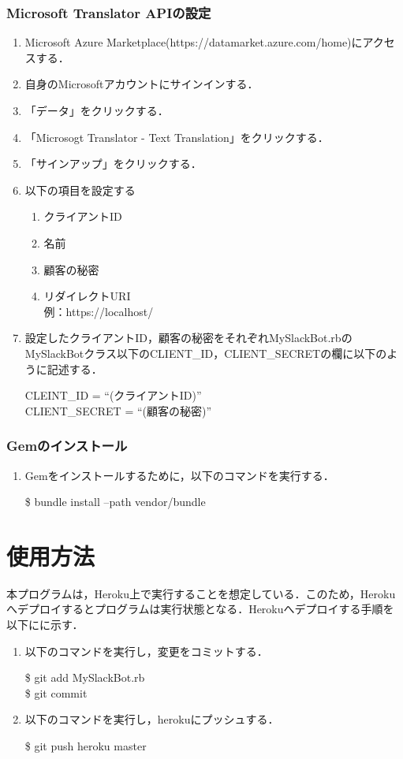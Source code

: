 \documentclass[fleqn, 14pt]{sty/extarticlej}
\begin{document}
\subsubsection{Microsoft Translator APIの設定}
\begin{enumerate}
\item Microsoft Azure Marketplace(https://datamarket.azure.com/home)にアクセスする．
\item 自身のMicrosoftアカウントにサインインする．
\item 「データ」をクリックする．
\item 「Microsogt Translator - Text Translation」をクリックする．
\item 「サインアップ」をクリックする．
\item 以下の項目を設定する
  \begin{enumerate}
  \item クライアントID
  \item 名前
  \item 顧客の秘密
  \item リダイレクトURI\\
    例：https://localhost/
    
  \end{enumerate}
\item 設定したクライアントID，顧客の秘密をそれぞれMySlackBot.rbのMySlackBotクラス以下のCLIENT\_ID，CLIENT\_SECRETの欄に以下のように記述する．
  
  CLEINT\_ID = ``(クライアントID)''\\
  CLIENT\_SECRET = ``(顧客の秘密)''\\

\end{enumerate}
\subsubsection{Gemのインストール}
\begin{enumerate}
\item Gemをインストールするために，以下のコマンドを実行する．
  
  \$ bundle install --path vendor/bundle\\

\end{enumerate}

\section{使用方法}
本プログラムは，Heroku上で実行することを想定している．このため，Herokuへデプロイするとプログラムは実行状態となる．Herokuへデプロイする手順を以下にに示す．
\begin{enumerate}
\item 以下のコマンドを実行し，変更をコミットする．
  
  \$ git add MySlackBot.rb\\
  \$ git commit\\
  
\item 以下のコマンドを実行し，herokuにプッシュする．
  
  \$ git push heroku master\\
\end{enumerate}
\end{document}
